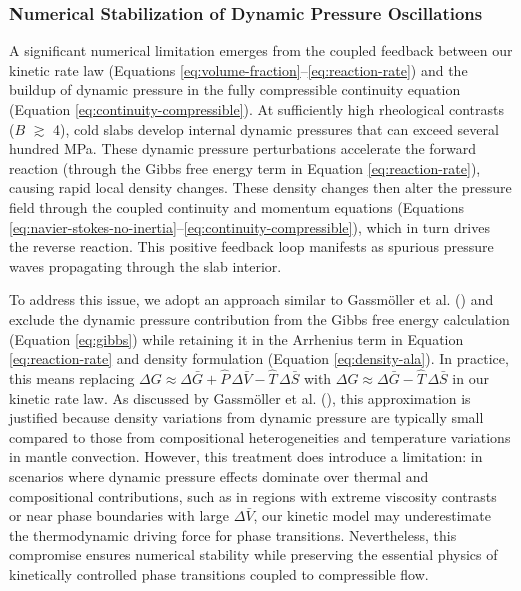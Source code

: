 \documentclass[
  paper=a4,
  ,captions=tableheading
]{scrartcl}
\begin{document}
\subsubsection{Numerical Stabilization of Dynamic Pressure
Oscillations}\label{sec:numerical-stability}

A significant numerical limitation emerges from the coupled feedback
between our kinetic rate law (Equations
\ref{eq:volume-fraction}--\ref{eq:reaction-rate}) and the buildup of
dynamic pressure in the fully compressible continuity equation (Equation
\ref{eq:continuity-compressible}). At sufficiently high rheological
contrasts (\(B\) \(\gtrsim\) 4), cold slabs develop internal dynamic
pressures that can exceed several hundred MPa. These dynamic pressure
perturbations accelerate the forward reaction (through the Gibbs free
energy term in Equation \ref{eq:reaction-rate}), causing rapid local
density changes. These density changes then alter the pressure field
through the coupled continuity and momentum equations (Equations
\ref{eq:navier-stokes-no-inertia}--\ref{eq:continuity-compressible}),
which in turn drives the reverse reaction. This positive feedback loop
manifests as spurious pressure waves propagating through the slab
interior.

To address this issue, we adopt an approach similar to Gassmöller et al.
() and exclude the dynamic pressure
contribution from the Gibbs free energy calculation (Equation
\ref{eq:gibbs}) while retaining it in the Arrhenius term in Equation
\ref{eq:reaction-rate} and density formulation (Equation
\ref{eq:density-ala}). In practice, this means replacing
\(\Delta G \approx \Delta \bar{G} + \hat{P}\, \Delta \bar{V} - \hat{T}\, \Delta \bar{S}\)
with \(\Delta G \approx \Delta \bar{G} - \hat{T}\, \Delta \bar{S}\) in
our kinetic rate law. As discussed by Gassmöller et al.
(), this approximation is justified
because density variations from dynamic pressure are typically small
compared to those from compositional heterogeneities and temperature
variations in mantle convection. However, this treatment does introduce
a limitation: in scenarios where dynamic pressure effects dominate over
thermal and compositional contributions, such as in regions with extreme
viscosity contrasts or near phase boundaries with large
\(\Delta \bar{V}\), our kinetic model may underestimate the
thermodynamic driving force for phase transitions. Nevertheless, this
compromise ensures numerical stability while preserving the essential
physics of kinetically controlled phase transitions coupled to
compressible flow.
\end{document}
